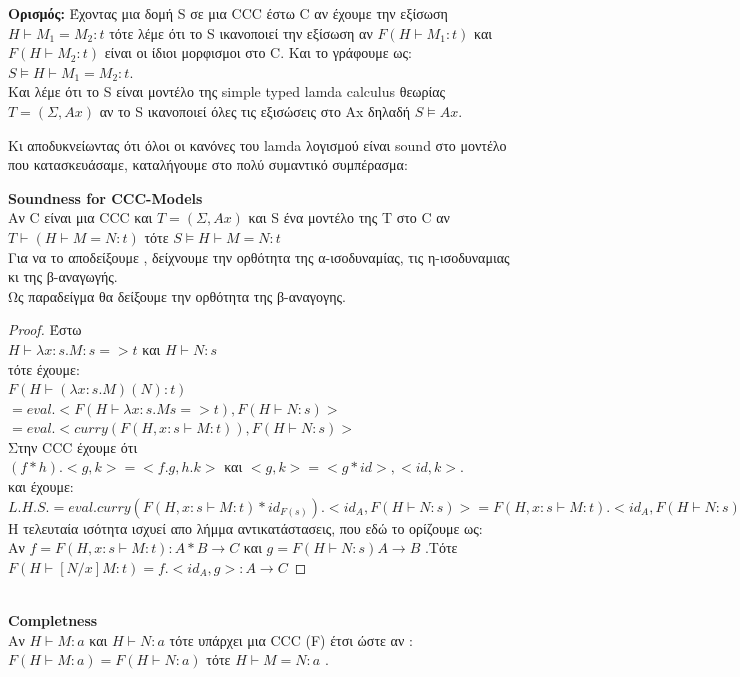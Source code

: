 \documentclass{article}
\begin{document}
\textbf{Ορισμός:} Έχοντας μια δομή S σε μια CCC έστω C αν έχουμε την εξίσωση $H \vdash M_1 = M_2 :t$ τότε λέμε ότι το S ικανοποιεί την εξίσωση αν $F(H \vdash M_1:t)$ και  $F(H \vdash M_2 :t)$ είναι οι ίδιοι μορφισμοι στο C.
Και το γράφουμε ως: \\
$S \models H \vdash M_1 = M_2 :t$.\\
Και λέμε ότι το  S είναι μοντέλο της simple typed lamda calculus θεωρίας $T = (\Sigma,Ax)$ αν το S ικανοποιεί όλες τις εξισώσεις στο Ax δηλαδή $S \models Ax$.

Κι αποδυκνείωντας ότι όλοι οι κανόνες του lamda λογισμού είναι sound στο μοντέλο που κατασκευάσαμε, καταλήγουμε στο πολύ συμαντικό συμπέρασμα:

\textbf{Soundness for CCC-Models} \\
Αν C είναι μια CCC και $T=(\Sigma,Ax)$ και S ένα μοντέλο της Τ στο C αν $T \vdash (H \vdash M=N:t)$ τότε $S \models H \vdash M=N:t$
\\ Για να το αποδείξουμε , δείχνουμε την ορθότητα της α-ισοδυναμίας, τις η-ισοδυναμιας κι της β-αναγωγής.\\
Ως παραδείγμα θα δείξουμε την ορθότητα της β-αναγογης.\\

\begin{proof} 
Έστω\\ $H \vdash \lambda x :s.M :s=>t$  και $H \vdash N:s$\\ τότε έχουμε:\\ $F(H \vdash (\lambda x :s.M)(N):t)$\\$=eval.<F(H \vdash \lambda x : s.M s=>t),F(H \vdash N:s)> $ \\$= eval.<curry(F(H,x:s \vdash M:t)),F(H \vdash N:s)>$\\
Στην CCC έχουμε ότι\\ $(f*h) . <g,k> = <f.g,h.k>$ και $<g,k>=<g*id>,<id,k>$.\\
και έχουμε:\\ $L.H.S.= eval. curry(F(H,x:s \vdash M:t)*id_{F(s)}).<id_A,F(H \vdash N:s) > =F(H,x:s \vdash M:t) .<id_A,F(H \vdash N:s)> = F(H\vdash [N/x]M:t)$
\\Η τελευταία ισότητα ισχυεί απο λήμμα αντικατάστασεις, που εδώ το ορίζουμε ως: \\Αν $f =F(H,x:s\vdash M:t):A*B \rightarrow C$ και $g=F(H \vdash N:s)A\rightarrow B$ .Τότε $F(H \vdash [N/x]M:t)=f.<id_A,g> :A \rightarrow C$ 
\end{proof} \\
 \textbf{Completness }
 \\
       Αν  $H \vdash M:a$ και $H \vdash N:a $ τότε υπάρχει μια CCC (F) έτσι ώστε αν :  $F(H \vdash M:a)=F(H \vdash N:a)$ τότε $H \vdash M = N :a$ .
 \\  \\
\end{document}
